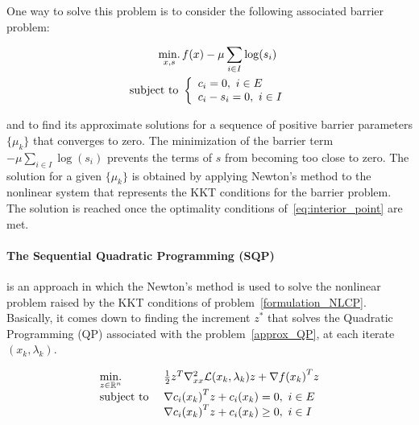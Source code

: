 One way to solve this problem is to consider the following associated barrier problem:

\begin{equation}
\begin{aligned}
\label{eq:barrier_question}
  \operatorname*{min.}_{x,s}{} & f(x)- \mu\sum_{i\in I} \log(s_i)\\
  \text{subject to } &
  \left\{
    \begin{array}{l}
     c_i = 0,\ i\in E\\
     c_i - s_i = 0,\ i\in I\\
  \end{array}
  \right.
\end{aligned}
\end{equation}

and to find its approximate solutions for a sequence of positive barrier parameters $\{\mu_k\}$ that converges to zero.
The minimization of the barrier term $-\mu\sum_{i\in I} \log(s_i)$ prevents the terms of $s$ from becoming too close to zero.
The solution for a given $\{\mu_k\}$ is obtained by applying Newton's method to the nonlinear system that represents the KKT conditions for the barrier problem.
The solution is reached once the optimality conditions of~\ref{eq:interior_point} are met.

\paragraph{The Sequential Quadratic Programming (SQP)} is an approach in which the Newton's method is used to solve the nonlinear problem raised by the KKT conditions of problem~\ref{formulation_NLCP}.
Basically, it comes down to finding the increment $z^*$ that solves the Quadratic Programming (QP) associated with the problem~\ref{approx_QP}, at each iterate $(x_k, \lambda_k)$.

\begin{equation}
\label{approx_QP}
  \begin{array}{ll}
    \operatorname*{min.}\limits_{z\in \mathbb{R}^n}{} & \frac{1}{2}z^T \nabla_{xx}^2\mathcal{L}(x_k, \lambda_k)z + \nabla {f(x_k)}^T z \\
    \text{subject to } & {\nabla c_i(x_k)}^T z+c_i(x_k)=0,\ i\in E \\
                       & {\nabla c_i(x_k)}^T z+c_i(x_k)\geq 0,\ i\in I
  \end{array}
\end{equation}

